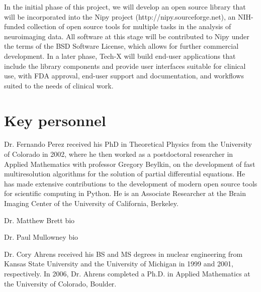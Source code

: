 \documentclass[10pt]{article}
\begin{document}
In the initial phase of this project, we will develop an open source library
that will be incorporated into the Nipy project (http://nipy.sourceforge.net),
an NIH-funded collection of open source tools for multiple tasks in the
analysis of neuroimaging data.  All software at this stage will be contributed
to Nipy under the terms of the BSD Software License, which allows for further
commercial development.  In a later phase, Tech-X will build end-user
applications that include the library components and provide user interfaces
suitable for clinical use, with FDA approval, end-user support and
documentation, and workflows suited to the needs of clinical work.

\section*{Key personnel}

Dr. Fernando Perez received his PhD in Theoretical Physics from the University
of Colorado in 2002, where he then worked as a postdoctoral researcher in
Applied Mathematics with professor Gregory Beylkin, on the development of fast
multiresolution algorithms for the solution of partial differential equations.
He has made extensive contributions to the development of modern open source
tools for scientific computing in Python. He is an Associate Researcher at the
Brain Imaging Center of the University of California, Berkeley.

Dr. Matthew Brett bio

Dr. Paul Mullowney bio

Dr. Cory Ahrens received his BS and MS degrees in nuclear engineering from
Kansas State University and the University of Michigan in 1999 and 2001,
respectively. In 2006, Dr. Ahrens completed a Ph.D. in Applied Mathematics at
the University of Colorado, Boulder.




\end{document}
